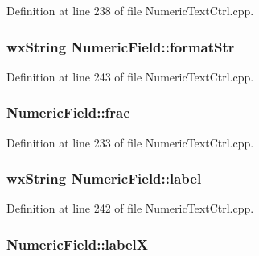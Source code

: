 Definition at line 238 of file Numeric\+Text\+Ctrl.\+cpp.

\subsubsection[{\texorpdfstring{format\+Str}{formatStr}}]{\setlength{\rightskip}{0pt plus 5cm}wx\+String Numeric\+Field\+::format\+Str}\hypertarget{class_numeric_field_ac7c29c7a0347181883c49a22567e6e06}{}\label{class_numeric_field_ac7c29c7a0347181883c49a22567e6e06}


Definition at line 243 of file Numeric\+Text\+Ctrl.\+cpp.

\subsubsection[{\texorpdfstring{frac}{frac}}]{ Numeric\+Field\+::frac}\hypertarget{class_numeric_field_adbaed9e5e7d3ebf39eba5957a4956c31}{}\label{class_numeric_field_adbaed9e5e7d3ebf39eba5957a4956c31}


Definition at line 233 of file Numeric\+Text\+Ctrl.\+cpp.

\subsubsection[{\texorpdfstring{label}{label}}]{\setlength{\rightskip}{0pt plus 5cm}wx\+String Numeric\+Field\+::label}\hypertarget{class_numeric_field_a365c04576a77909cf1caecb5494ce792}{}\label{class_numeric_field_a365c04576a77909cf1caecb5494ce792}


Definition at line 242 of file Numeric\+Text\+Ctrl.\+cpp.

\subsubsection[{\texorpdfstring{labelX}{labelX}}]{ Numeric\+Field\+::labelX}\hypertarget{class_numeric_field_af2504f1934de37192849b98f396427f0}{}\label{class_numeric_field_af2504f1934de37192849b98f396427f0}


